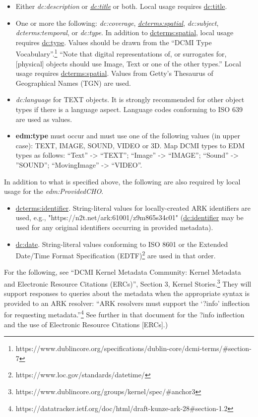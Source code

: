 \documentclass[11pt]{article}
\begin{document}
\begin{itemize}

  \item Either \textit{dc:description} or \underline{\textit{dc:title}} or both. Local usage requires \underline{dc:title}.

  \item One or more the following: \textit{dc:coverage}, \underline{\textit{dcterms:spatial}}, \textit{dc:subject}, \textit{dcterms:temporal}, or \textit{dc:type}. In addition to \underline{dcterms:spatial}, local usage requires \underline{dc:type}. Values should be drawn from the ``DCMI Type Vocabulary''.\footnote{https://www.dublincore.org/specifications/dublin-core/dcmi-terms/\#section-7} ``Note that digital representations of, or surrogates for, [physical] objects should use Image, Text or one of the other types.'' Local usage requires \underline{dcterms:spatial}. Values from Getty's Thesaurus of Geographical Names (TGN) are used.

  \item \textit{dc:language} for TEXT objects. It is strongly recommended for other object types if there is a language aspect. Language codes conforming to ISO 639 are used as values.

  \item \textbf{edm:type} must occur and must use one of the following values (in upper case): TEXT, IMAGE, SOUND, VIDEO or 3D. Map DCMI types to EDM types as follows: ``Text'' -> ``TEXT''; ``Image'' -> ``IMAGE''; ``Sound'' -> ''SOUND''; ``MovingImage'' -> ``VIDEO''. 
\end{itemize}

In addition to what is specified above, the following are also required by local usage for the \textit{edm:ProvidedCHO}.
\begin{itemize}
  \item \underline{dcterms:identifier}. String-literal values for locally-created ARK identifiers are used, e.g., "https://n2t.net/ark:61001/z9m865s34c01" (\underline{dc:identifier} may be used for any original identifiers occurring in provided metadata).

  \item \underline{dc:date}. String-literal values conforming to ISO 8601 or the Extended Date/Time Format Specification (EDTF)\footnote{https://www.loc.gov/standards/datetime/} are used in that order.

\end{itemize}

For the following, see ``DCMI Kernel Metadata Community: Kernel Metadata and Electronic Resource Citations (ERCs)'', Section 3, Kernel Stories.\footnote{https://www.dublincore.org/groups/kernel/spec/\#anchor3} They will support responses to queries about the metadata when the appropriate syntax is provided to an ARK resolver: ``ARK resolvers must support the `?info' inflection for requesting metadata.''\footnote{https://datatracker.ietf.org/doc/html/draft-kunze-ark-28\#section-1.2} See further in that document for the ?info inflection and the use of Electronic Resource Citations [ERCs].)
\end{document}
